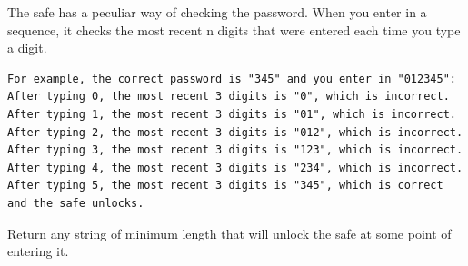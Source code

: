 \documentclass[9pt, b5paaper]{book}
\begin{document}
The safe has a peculiar way of checking the password. When you enter in a sequence, it checks the most recent n digits that were entered each time you type a digit.
\begin{verbatim}
For example, the correct password is "345" and you enter in "012345":
After typing 0, the most recent 3 digits is "0", which is incorrect.
After typing 1, the most recent 3 digits is "01", which is incorrect.
After typing 2, the most recent 3 digits is "012", which is incorrect.
After typing 3, the most recent 3 digits is "123", which is incorrect.
After typing 4, the most recent 3 digits is "234", which is incorrect.
After typing 5, the most recent 3 digits is "345", which is correct and the safe unlocks.
\end{verbatim}
Return any string of minimum length that will unlock the safe at some point of entering it.
\end{document}
